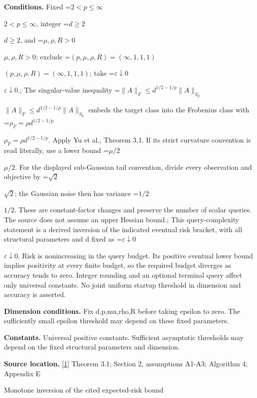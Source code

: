 \documentclass[10pt,a4paper]{article}
\newcommand{\AtlasMath}[1]{\par\begingroup\centering\setbox0=\hbox{$\displaystyle #1$}\ifdim\wd0>1.4\linewidth\typeout{ATLAS WIDE FORMULA: \the\wd0}\fi\ifdim\wd0>\linewidth\resizebox{\linewidth}{!}{\box0}\else\box0\fi\par\endgroup}
\newcommand{\AtlasInlineMath}[1]{\begingroup\setbox0=\hbox{$#1$}\ifdim\wd0>.4\linewidth\endgroup\AtlasMath{#1}\else\endgroup$#1$\fi}
\begin{document}
\textbf{Conditions.} Fixed \AtlasInlineMath{2<p\le\infty}, integer \AtlasInlineMath{d\ge2}, and \AtlasInlineMath{\mu,\rho,R>0}; exclude \AtlasInlineMath{(p,\mu,\rho,R)=(\infty,1,1,1)}; take \AtlasInlineMath{\varepsilon\downarrow0}.; The singular-value inequality \AtlasInlineMath{\|A\|_F\le d^{1/2-1/p}\|A\|_{S_p}} embeds the target class into the Frobenius class with \AtlasInlineMath{\rho_F=\rho d^{1/2-1/p}}. Apply Yu et al., Theorem 3.1. If its strict curvature convention is read literally, use a lower bound \AtlasInlineMath{\mu/2}. For the displayed sub-Gaussian tail convention, divide every observation and objective by \AtlasInlineMath{\sqrt2}; the Gaussian noise then has variance \AtlasInlineMath{1/2}. These are constant-factor changes and preserve the number of scalar queries. The source does not assume an upper Hessian bound.; This query-complexity statement is a derived inversion of the indicated eventual risk bracket, with all structural parameters and d fixed as \AtlasInlineMath{\varepsilon\downarrow0}. Risk is nonincreasing in the query budget. Its positive eventual lower bound implies positivity at every finite budget, so the required budget diverges as accuracy tends to zero. Integer rounding and an optional terminal query affect only universal constants. No joint uniform startup threshold in dimension and accuracy is asserted.



\textbf{Dimension conditions.} Fix d,p,mu,rho,R before taking epsilon to zero. The sufficiently small epsilon threshold may depend on these fixed parameters.



\textbf{Constants.} Universal positive constants. Sufficient asymptotic thresholds may depend on the fixed structural parameters and dimension.



\textbf{Source location.} \href{https://papers.nips.cc/paper_files/paper/2024/file/b444ad72520a5f5c467343be88e352ed-Paper-Conference.pdf}{[1]} Theorem 3.1; Section 2, assumptions A1-A3; Algorithm 4; Appendix E



Monotone inversion of the cited expected-risk bound
\end{document}
